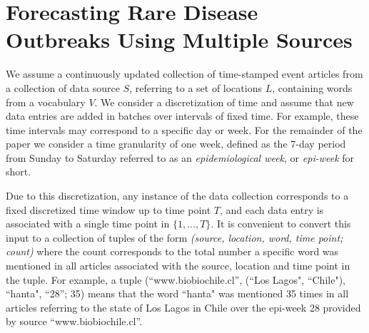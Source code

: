 \documentclass[twoside,leqno,twocolumn]{article}
\newcommand{\squishlist}{
   \begin{list}{$\bullet$}
    {
      \setlength{\itemsep}{0pt}
      \setlength{\parsep}{3pt}
      \setlength{\topsep}{3pt}
      \setlength{\partopsep}{0pt}
      \setlength{\leftmargin}{1.5em}
      \setlength{\labelwidth}{1em}
      \setlength{\labelsep}{0.5em} } }
\newcommand{\squishend}{
    \end{list}  }
\newcommand{\model}{{STAT}\xspace} %
\newcommand{\fullmodel}{{{\sf SourceSeer}}\xspace}
\begin{document}
%
%
\vspace{-10pt}
\section{Forecasting Rare Disease Outbreaks Using Multiple Sources}
\label{sec:problem}
We assume a continuously updated collection of time-stamped event articles from a collection of data source $S$, referring to a set of locations $L$, containing words from a vocabulary $V$. We consider a discretization of time and assume that new data entries are added in batches over intervals of fixed time. For example, these time intervals may correspond to a specific day or week. For the remainder of the paper we consider a time granularity of one week, defined as the 7-day period from Sunday to Saturday referred to as an {\em epidemiological week}, or {\em epi-week} for short. 

Due to this discretization, any instance of the data collection corresponds to a fixed discretized time window up to time point $T$, and each data entry is associated with a single time point in $\{1, \dots,T\}$. It is convenient to convert this input to a collection of tuples of the form {\em (source, location, word, time point; count)} where the count corresponds to the total number a specific word was mentioned in all articles associated with the source, location and time point in the tuple. For example, a tuple (``www.biobiochile.cl'', (``Los Lagos", ``Chile"), ``hanta", ``28''; 35) means that the word ``hanta" was mentioned 35 times in all articles referring to the state of Los Lagos in Chile over the epi-week 28 provided by source ``www.biobiochile.cl''.  
\end{document}
